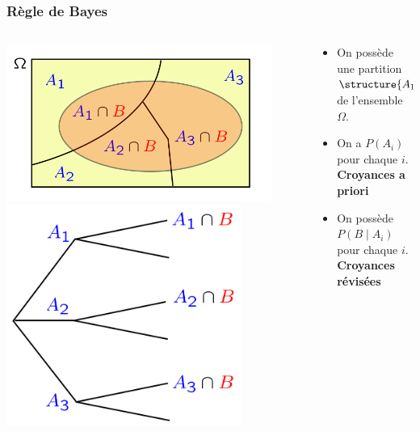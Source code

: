 \documentclass{beamer}
\begin{document}
\begin{frame}[t]
    \frametitle{Règle de Bayes}
    
   \begin{columns}
       \begin{column}{0.4\textwidth}
           {
                   \centering
                   \includegraphics[width=0.9\textwidth]{./form_total_probablity.png}
               }
        {
                \centering
                \includegraphics[width=0.8\textwidth]{./total_probability_tree.png}
        }
       \end{column}
       \begin{column}{0.6\textwidth}
           \begin{itemize}
               \scriptsize
               \item<1-> On possède une partition $\structure{A_1,A_2,A_3}$ de
                   l'ensemble $\Omega$. \\[8pt]
               \item<1-> On a $P(A_i)$ pour chaque $i$. \alert{\textbf{Croyances
                   a priori}} 
               \item<3-> On possède $P(B \;|\; A_i)$ pour chaque $i$.
                   \alert{\textbf{Croyances révisées}} 
           \end{itemize}


\end{column}
\end{columns}
\end{frame}
\end{document}
